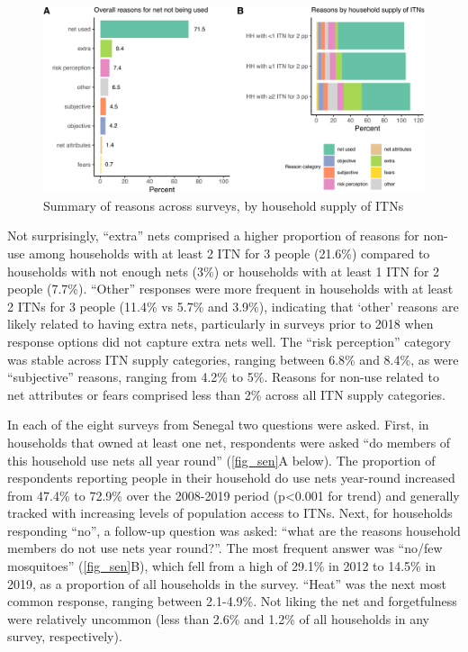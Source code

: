 \documentclass[review,
3p]{elsarticle} %
\begin{document}
\begin{figure}

{\centering \includegraphics[width=1\linewidth]{reasons_paper_files/figure-latex/fig_cats-1} 

}

\caption{\label{fig_cats}Summary of reasons across surveys, by household supply of ITNs}\label{fig:fig_cats}
\end{figure}

Not surprisingly, ``extra'' nets comprised a higher proportion of
reasons for non-use among households with at least 2 ITN for 3 people
(21.6\%) compared to households with not enough nets (3\%) or households
with at least 1 ITN for 2 people (7.7\%). ``Other'' responses were more
frequent in households with at least 2 ITNs for 3 people (11.4\% vs
5.7\% and 3.9\%), indicating that `other' reasons are likely related to
having extra nets, particularly in surveys prior to 2018 when response
options did not capture extra nets well. The ``risk perception''
category was stable across ITN supply categories, ranging between 6.8\%
and 8.4\%, as were ``subjective'' reasons, ranging from 4.2\% to 5\%.
Reasons for non-use related to net attributes or fears comprised less
than 2\% across all ITN supply categories.

In each of the eight surveys from Senegal two questions were asked.
First, in households that owned at least one net, respondents were asked
``do members of this household use nets all year round'' (\ref{fig_sen}A
below). The proportion of respondents reporting people in their
household do use nets year-round increased from 47.4\% to 72.9\% over
the 2008-2019 period (p\textless0.001 for trend) and generally tracked
with increasing levels of population access to ITNs. Next, for
households responding ``no'', a follow-up question was asked: ``what are
the reasons household members do not use nets year round?''. The most
frequent answer was ``no/few mosquitoes'' (\ref{fig_sen}B), which fell
from a high of 29.1\% in 2012 to 14.5\% in 2019, as a proportion of all
households in the survey. ``Heat'' was the next most common response,
ranging between 2.1-4.9\%. Not liking the net and forgetfulness were
relatively uncommon (less than 2.6\% and 1.2\% of all households in any
survey, respectively).
\end{document}
